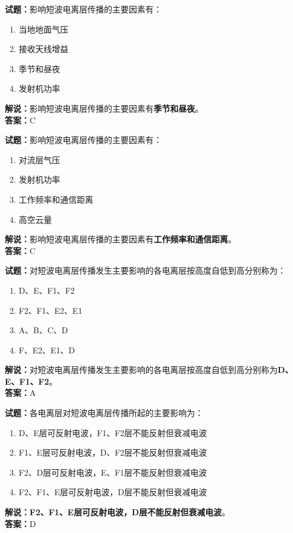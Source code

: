 \documentclass{ctexbook}
\begin{document}
\vspace{1em}

\textbf{试题：}影响短波电离层传播的主要因素有：
\begin{enumerate}[leftmargin=3em]
  \item 当地地面气压
  \item 接收天线增益
  \item 季节和昼夜
  \item 发射机功率
\end{enumerate}
\noindent\textbf{解说：}影响短波电离层传播的主要因素有\textbf{季节和昼夜}。\\\noindent\textbf{答案：}C

\vspace{1em}

\textbf{试题：}影响短波电离层传播的主要因素有：
\begin{enumerate}[leftmargin=3em]
  \item 对流层气压
  \item 发射机功率
  \item 工作频率和通信距离
  \item 高空云量
\end{enumerate}
\noindent\textbf{解说：}影响短波电离层传播的主要因素有\textbf{工作频率和通信距离}。\\\noindent\textbf{答案：}C

\vspace{1em}

\textbf{试题：}对短波电离层传播发生主要影响的各电离层按高度自低到高分别称为：
\begin{enumerate}[leftmargin=3em]
  \item D、E、F1、F2
  \item F2、F1、E2、E1
  \item A、B、C、D
  \item F、E2、E1、D
\end{enumerate}
\noindent\textbf{解说：}对短波电离层传播发生主要影响的各电离层按高度自低到高分别称为\textbf{D、E、F1、F2}。\\\noindent\textbf{答案：}A

\vspace{1em}

\textbf{试题：}各电离层对短波电离层传播所起的主要影响为：
\begin{enumerate}[leftmargin=3em]
  \item D、E层可反射电波，F1、F2层不能反射但衰减电波
  \item F1、E层可反射电波，D、F2层不能反射但衰减电波
  \item F2、D层可反射电波，E、F1层不能反射但衰减电波
  \item F2、F1、E层可反射电波，D层不能反射但衰减电波
\end{enumerate}
\noindent\textbf{解说：}\textbf{F2、F1、E层可反射电波，D层不能反射但衰减电波}。\\\noindent\textbf{答案：}D
\end{document}
